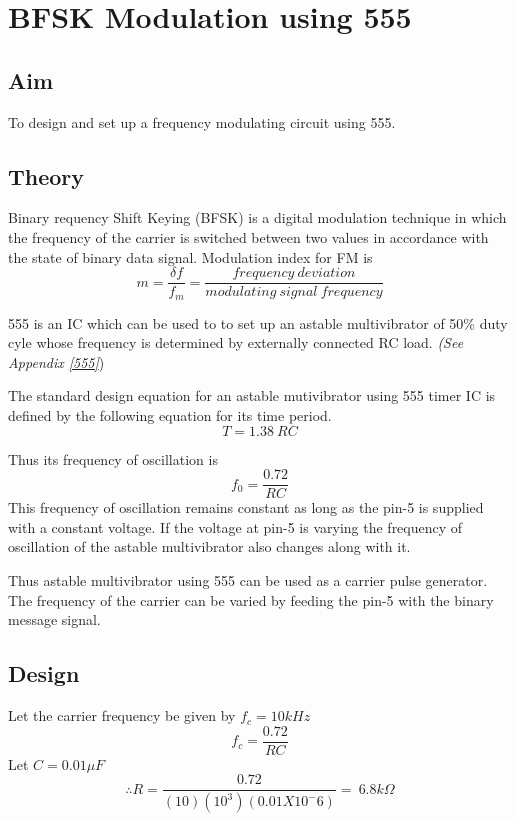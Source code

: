 \chapter[BFSK Modulation using 555]{BFSK Modulation using 555}

\section*{Aim}
To design and set up a frequency modulating circuit using 555.

\section*{Theory}
Binary requency Shift Keying (BFSK) is a digital modulation technique in which the frequency of the carrier is switched between two values in accordance with the state of binary data signal.
Modulation index for FM is 
\begin{equation}
m= \frac{\delta f}{f_m}=\frac{frequency \ deviation}{modulating \ signal\  frequency}
\end{equation}

555 is an IC which can be used to to set up an astable multivibrator of 50\% duty cyle whose frequency is determined by externally connected RC load. \emph{(See Appendix \ref{555}})

\noindent The standard design equation for an astable mutivibrator using 555 timer IC is defined by the following equation for its time period.
\begin{equation}
T=1.38 \ RC
\end{equation}

\noindent Thus its frequency of oscillation is 
\begin{equation}
f_0 = \frac{0.72}{RC}
\end{equation}
This frequency of oscillation remains constant as long as the pin-5 is supplied with a constant voltage. If the voltage at pin-5 is varying the frequency of oscillation of the astable multivibrator also changes along with it.

Thus astable multivibrator using 555 can be used as a carrier pulse generator. The frequency of the carrier can be varied by feeding the pin-5 with the binary message signal.
\section*{Design}
\noindent Let the carrier frequency be given by $f_c= 10 kHz$
\begin{equation}
f_c=\frac{0.72}{RC}
\end{equation}
\noindent Let $C=0.01 \mu F$
\begin{equation}
\therefore
R=\frac{0.72}{(10) (10^3)(0.01 X 10^-6)}= \ 6.8 k\Omega
\end{equation}

